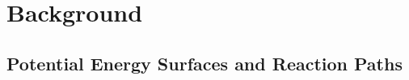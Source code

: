 


\chapter{Background}
\label{chap:mr}

\section{Potential Energy Surfaces and Reaction Paths}
\label{sec:background-pes}
